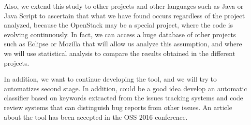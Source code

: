 \documentclass[ifip]{svmult}
\begin{document}
Also, we extend this study to other projects and other languages such as Java or Java Script to ascertain that what we have found occurs regardless of the project analyzed, because the OpenStack may be a special project, where the code is evolving continuously. In fact, we can access a huge database of other projects such as Eclipse or Mozilla that will allow us analyze this assumption, and where we will use statistical analysis to compare the results obtained in the different projects. 

In addition, we want to continue developing the tool, and we will try to automatizes second stage. In addition, could be a good idea develop an automatic classifier based on keywords extracted from the issues tracking systems and code review systems that can distinguish bug reports from other issues. An article about the tool has been accepted in the OSS 2016 conference.



\end{document}
